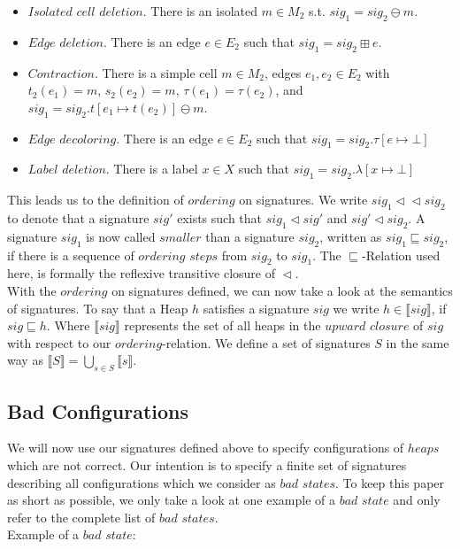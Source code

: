 \begin{itemize}

	\item $Isolated$ $cell$ $deletion$. There is an isolated $m \in M_2$ s.t. $sig_1 = sig_2 \ominus m$.
	\item $Edge$ $deletion$. There is an edge $e \in E_2$ such that $sig_1 = sig_2 \boxplus e$.
	\item $Contraction$. There is a simple cell $m \in M_2$, edges $e_1,e_2 \in E_2$ with $t_2(e_1) = m$,
		  $s_2(e_2) = m$, $\tau(e_1) = \tau(e_2)$, and $sig_1 = sig_2.t[e_1 \mapsto t(e_2)] \ominus m$. 
	\item $Edge$ $decoloring$. There is an edge $e \in E_2$ such that $sig_1 = sig_2.\tau[e \mapsto \bot]$
	\item $Label$ $deletion$. There is a label $x \in X$ such that $sig_1 = sig_2.\lambda[x \mapsto \bot]$

\end{itemize}
\noindent
This leads us to the definition of $ordering$ on signatures. We write $sig_1 \vartriangleleft \vartriangleleft sig_2$ to denote
that a signature $sig'$ exists such that $sig_1 \vartriangleleft sig'$ and $sig' \vartriangleleft sig_2$.
A signature $sig_1$ is now called $smaller$ than a signature $sig_2$, written as $sig_1 \sqsubseteq sig_2$, if there is
a sequence of $ordering$ $steps$ from $sig_2$ to $sig_1$. The $\sqsubseteq$-Relation used here, is formally the reflexive transitive
closure of $\vartriangleleft$.\\
With the $ordering$ on signatures defined, we can now take a look at the semantics of signatures.
To say that a Heap $h$ satisfies a signature $sig$ we write $h \in \llbracket sig \rrbracket$, if $sig \sqsubseteq h$.
Where $\llbracket sig \rrbracket$ represents the set of all heaps in the $upward$ $closure$ of $sig$ with respect to our
$ordering$-relation. We define a set of signatures $S$ in the same way as 
$\llbracket S \rrbracket = \bigcup_{s \in S} \llbracket s \rrbracket$.

\subsection{Bad Configurations}
We will now use our signatures defined above to specify configurations of $heaps$ which are not correct. 
Our intention is to specify a finite set of signatures describing all configurations which we consider as $bad$ $states$.
To keep this paper as short as possible, we only take a look at one example of a $bad$ $state$ and only refer to the complete
list of $bad$ $states$.\\
Example of a $bad$ $state$:

